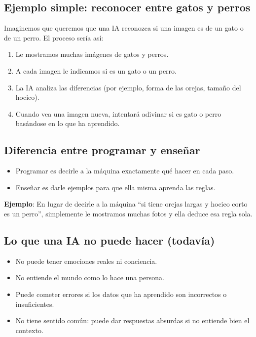 \documentclass[12pt]{article}
\begin{document}
	\subsection*{Ejemplo simple: reconocer entre gatos y perros}
	Imaginemos que queremos que una IA reconozca si una imagen es de un gato o de un perro. El proceso sería así:
	\begin{enumerate}
		\item Le mostramos muchas imágenes de gatos y perros.
		\item A cada imagen le indicamos si es un gato o un perro.
		\item La IA analiza las diferencias (por ejemplo, forma de las orejas, tamaño del hocico).
		\item Cuando vea una imagen nueva, intentará adivinar si es gato o perro basándose en lo que ha aprendido.
	\end{enumerate}
	
	\subsection*{Diferencia entre programar y enseñar}
	\begin{itemize}
		\item Programar es decirle a la máquina exactamente qué hacer en cada paso.
		\item Enseñar es darle ejemplos para que ella misma aprenda las reglas.
	\end{itemize}
	
	\textbf{Ejemplo}: En lugar de decirle a la máquina “si tiene orejas largas y hocico corto es un perro”, simplemente le mostramos muchas fotos y ella deduce esa regla sola.
	
	\subsection*{Lo que una IA no puede hacer (todavía)}
	\begin{itemize}
		\item No puede tener emociones reales ni conciencia.
		\item No entiende el mundo como lo hace una persona.
		\item Puede cometer errores si los datos que ha aprendido son incorrectos o insuficientes.
		\item No tiene sentido común: puede dar respuestas absurdas si no entiende bien el contexto.
	\end{itemize}
	
\end{document}
